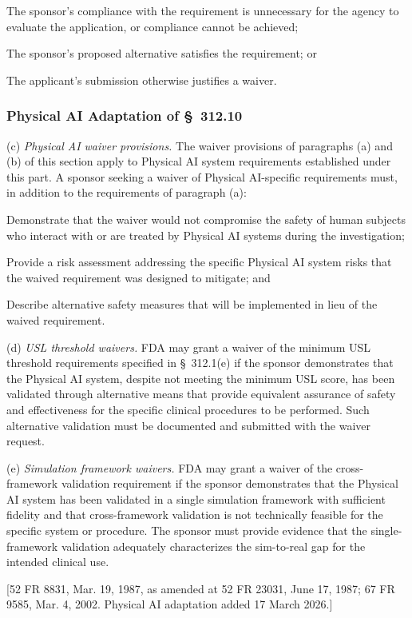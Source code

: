 \documentclass[11pt]{article}
\begin{document}
\begin{description}[leftmargin=0.5cm,style=sameline]
\item[(1)] The sponsor's compliance with the requirement is unnecessary for the agency to evaluate the application, or compliance cannot be achieved;
\item[(2)] The sponsor's proposed alternative satisfies the requirement; or
\item[(3)] The applicant's submission otherwise justifies a waiver.
\end{description}

\subsubsection{Physical AI Adaptation of \S~312.10}

(c) \textit{Physical AI waiver provisions.} The waiver provisions of paragraphs (a) and (b) of this section apply to Physical AI system requirements established under this part. A sponsor seeking a waiver of Physical AI-specific requirements must, in addition to the requirements of paragraph (a):

\begin{description}[leftmargin=0.8cm,style=sameline]
\item[(i)] Demonstrate that the waiver would not compromise the safety of human subjects who interact with or are treated by Physical AI systems during the investigation;
\item[(ii)] Provide a risk assessment addressing the specific Physical AI system risks that the waived requirement was designed to mitigate; and
\item[(iii)] Describe alternative safety measures that will be implemented in lieu of the waived requirement.
\end{description}

(d) \textit{USL threshold waivers.} FDA may grant a waiver of the minimum USL threshold requirements specified in \S~312.1(e) if the sponsor demonstrates that the Physical AI system, despite not meeting the minimum USL score, has been validated through alternative means that provide equivalent assurance of safety and effectiveness for the specific clinical procedures to be performed. Such alternative validation must be documented and submitted with the waiver request.

(e) \textit{Simulation framework waivers.} FDA may grant a waiver of the cross-framework validation requirement if the sponsor demonstrates that the Physical AI system has been validated in a single simulation framework with sufficient fidelity and that cross-framework validation is not technically feasible for the specific system or procedure. The sponsor must provide evidence that the single-framework validation adequately characterizes the sim-to-real gap for the intended clinical use.

[52 FR 8831, Mar. 19, 1987, as amended at 52 FR 23031, June 17, 1987; 67 FR 9585, Mar. 4, 2002. Physical AI adaptation added 17 March 2026.]

\clearpage
\end{document}

